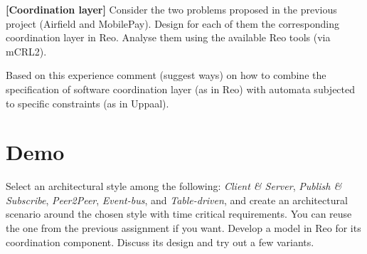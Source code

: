 \documentclass[11pt]{article}
\begin{document}

\begin{exercise} \label{ex:airfield}
\textbf{[Coordination layer]}
Consider the two problems proposed in the previous project (Airfield and MobilePay). Design for each of them the corresponding coordination layer in Reo. Analyse them using the available Reo tools (via mCRL2).

\medskip

Based on this experience comment (suggest ways) on how to combine the specification of software coordination layer (as in Reo) with automata subjected to specific constraints (as in Uppaal).
\end{exercise}



\section*{Demo}


\begin{exercise}  \label{ex:demo}
Select an architectural style among the following: \emph{Client \& Server}, \emph{Publish \& Subscribe}, \emph{Peer2Peer}, \emph{Event-bus}, and \emph{Table-driven}, and create an architectural scenario around the chosen style with time critical requirements. You can reuse the one from the previous assignment if you want. Develop a model in Reo for its coordination component. Discuss its design and try out a few variants.
\end{exercise}


 
\end{document}
